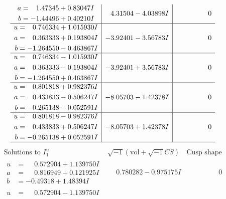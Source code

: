\documentclass[1p]{elsarticle_modified}
\theoremstyle{definition}
\newcommand{\I}{\sqrt{-1}}
\begin{document}
$$\begin{array}{c|c|c}
\begin{aligned}
a &= \phantom{-}1.47345 + 0.83047 I \\
b &= -1.44496 + 0.40210 I\end{aligned}
 & \phantom{-}4.31504 - 4.03898 I & \phantom{-0.000000 } 0 \\ \hline\begin{aligned}
u &= \phantom{-}0.746334 + 1.015930 I \\
a &= \phantom{-}0.363333 + 0.193804 I \\
b &= -1.264550 - 0.463867 I\end{aligned}
 & -3.92401 - 3.56783 I & \phantom{-0.000000 } 0 \\ \hline\begin{aligned}
u &= \phantom{-}0.746334 - 1.015930 I \\
a &= \phantom{-}0.363333 - 0.193804 I \\
b &= -1.264550 + 0.463867 I\end{aligned}
 & -3.92401 + 3.56783 I & \phantom{-0.000000 } 0 \\ \hline\begin{aligned}
u &= \phantom{-}0.801818 + 0.982376 I \\
a &= \phantom{-}0.433833 - 0.506247 I \\
b &= -0.265138 - 0.052591 I\end{aligned}
 & -8.05703 - 1.42378 I & \phantom{-0.000000 } 0 \\ \hline\begin{aligned}
u &= \phantom{-}0.801818 - 0.982376 I \\
a &= \phantom{-}0.433833 + 0.506247 I \\
b &= -0.265138 + 0.052591 I\end{aligned}
 & -8.05703 + 1.42378 I & \phantom{-0.000000 } 0\\
 \hline 
 \end{array}$$\newpage$$\begin{array}{c|c|c}  
\text{Solutions to }I^u_{1}& \I (\text{vol} + \sqrt{-1}CS) & \text{Cusp shape}\\
 \hline 
\begin{aligned}
u &= \phantom{-}0.572904 + 1.139750 I \\
a &= \phantom{-}0.816949 + 0.121925 I \\
b &= -0.49318 + 1.48394 I\end{aligned}
 & \phantom{-}0.780282 - 0.975175 I & \phantom{-0.000000 } 0 \\ \hline\begin{aligned}
u &= \phantom{-}0.572904 - 1.139750 I \\

\end{aligned}
\end{array}$$
\end{document}
